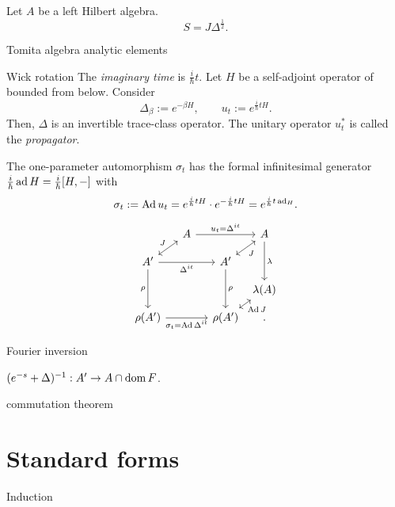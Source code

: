 \documentclass{../../large}
\begin{document}
\begin{prb}
Let $A$ be a left Hilbert algebra.
\[S=J\Delta^{\frac12}.\]

Tomita algebra
analytic elements
\end{prb}


\begin{prb}
Wick rotation
The \emph{imaginary time} is $\frac i\hbar t$.
Let $H$ be a self-adjoint operator of bounded from below.
Consider
\[\Delta_\beta:=e^{-\beta H},\qquad u_t:=e^{\frac i\hbar tH}.\]
Then, $\Delta$ is an invertible trace-class operator.
The unitary operator $u_t^*$ is called the \emph{propagator}.


The one-parameter automorphism $\sigma_t$ has the formal infinitesimal generator $\frac i\hbar\operatorname{ad} H=\frac i\hbar[H,-]$ with
\[\sigma_t:=\operatorname{Ad} u_t=e^{\frac i\hbar tH}\cdot e^{-\frac i\hbar tH}=e^{\frac i\hbar t\operatorname{ad}_H}.\]

\[\begin{tikzcd}[column sep={3.5em,between origins},row sep={2.5em,between origins}]
&A\ar{rr}{u_t=\Delta^{it}}&&A\ar{dd}{\lambda}\\
A'\ar[<->]{ur}{J}\ar[swap]{rr}{\Delta^{it}}\ar[swap]{dd}{\rho}&&A'\ar[<->,swap]{ur}{J}\ar{dd}{\rho}&\\
&&&\lambda(A)\\
\rho(A')\ar[swap]{rr}{\sigma_t=\Ad\Delta^{it}}&&\rho(A')\ar[<->,swap]{ur}{\Ad J}&.
\end{tikzcd}\]
\begin{parts}
\item Fourier inversion
\item $(e^{-s}+\Delta)^{-1}:A'\to A\cap\operatorname{dom} F$.
\item commutation theorem
\end{parts}
\end{prb}





\section{Standard forms}


\begin{prb}
Induction
\end{prb}

\begin{prb}
\end{prb}
\end{document}
